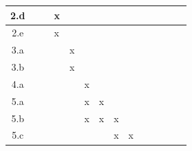 \begin{table}[ht!]
\begin{tabular}{|c|l|l|l|l|l|l|l|l|l|l|l|l|l|}
2.d                                               &                        &                        & x                      &                        &                        &                        &                        &                        &                        &                        &   &   &   \\ \hline
2.e                                               &                        &                        & x                      &                        &                        &                        &                        &                        &                        &                        &   &   &   \\ \hline
3.a                                               &                        &                        &                        & x                      &                        &                        &                        &                        &                        &                        &   &   &   \\ \hline
3.b                                               &                        &                        &                        & x                      &                        &                        &                        &                        &                        &                        &   &   &   \\ \hline
4.a                                               &                        &                        &                        &                        & x                      &                        &                        &                        &                        &                        &   &   &   \\ \hline
5.a                                               &                        &                        &                        &                        & x                      & x                      &                        &                        &                        &                        &   &   &   \\ \hline
5.b                                               &                        &                        &                        &                        & x                      & x                      & x                      &                        &                        &                        &   &   &   \\ \hline
5.c                                               &                        &                        &                        &                        &                        &                        & x                      & x                      &                        &                        &   &   &   \\ \hline

\end{tabular}
\end{table}
